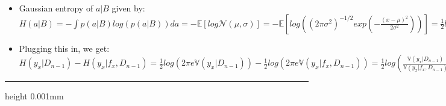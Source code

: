 \begin{itemize}
\begin{itemize}
        \item Gaussian entropy of $a|B$ given by: $H(a|B) = - \int p(a|B) log(p(a|B)) da = - \mathbb{E} [ log \mathcal{N}(\mu, \sigma) ] = - \mathbb{E} [ log ((2 \pi \sigma^2)^{-1/2} exp ( - \frac{ (x-\mu)^2 }{ 2 \sigma^2 } )) ] = \frac{1}{2} log (2 \pi \sigma^2) + \frac{1}{2\sigma^2} \mathbb{E}[ (x-\mu)^2 ] = \frac{1}{2} log(2 \pi \sigma^2) + \frac{1}{2} \times 1 = \frac{1}{2} log(2 \pi \sigma^2) + \frac{1}{2} log(e) = \frac{1}{2} log(2 \pi e \sigma^2) $
        \item Plugging this in, we get: $H(y_x | D_{n-1}) - H(y_x | f_x, D_{n-1}) = \frac{1}{2} log(2 \pi e  \mathbb{V}(y_x | D_{n-1})) - \frac{1}{2} log(2 \pi e \mathbb{V}(y_x | f_x, D_{n-1})) = \frac{1}{2} log( \frac{\mathbb{V}(y_x | D_{n-1})}{\mathbb{V}(y_x | f_x, D_{n-1})} )$ 
    \end{itemize}
\end{itemize}

{\color{lightgray}\hrule height 0.001mm}

